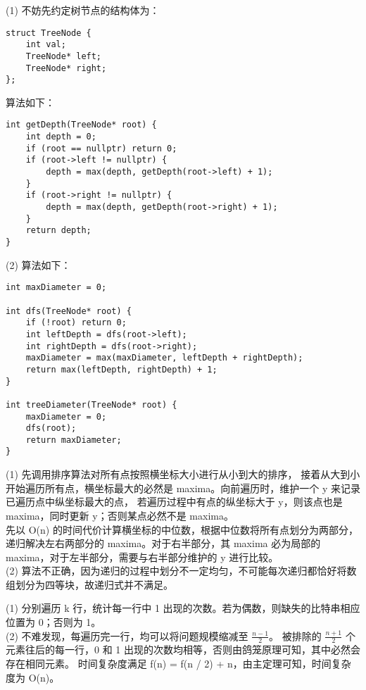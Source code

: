 \documentclass[12pt, a4paper, oneside]{ctexart}
\begin{document}
\begin{solution}[7.5]
(1) 不妨先约定树节点的结构体为：
\begin{verbatim}
struct TreeNode {
    int val;
    TreeNode* left;
    TreeNode* right;
};
\end{verbatim}
算法如下：
\begin{verbatim}
int getDepth(TreeNode* root) {
    int depth = 0;
    if (root == nullptr) return 0;
    if (root->left != nullptr) {
        depth = max(depth, getDepth(root->left) + 1);
    }
    if (root->right != nullptr) {
        depth = max(depth, getDepth(root->right) + 1);
    }
    return depth;
}
\end{verbatim}
(2) 算法如下：
\begin{verbatim}
int maxDiameter = 0;

int dfs(TreeNode* root) {
    if (!root) return 0;
    int leftDepth = dfs(root->left);
    int rightDepth = dfs(root->right);
    maxDiameter = max(maxDiameter, leftDepth + rightDepth);
    return max(leftDepth, rightDepth) + 1;
}

int treeDiameter(TreeNode* root) {
    maxDiameter = 0;
    dfs(root);
    return maxDiameter;
}
\end{verbatim}
\end{solution}

\begin{solution}[7.8]
(1) 先调用排序算法对所有点按照横坐标大小进行从小到大的排序，
接着从大到小开始遍历所有点，横坐标最大的必然是 maxima。向前遍历时，维护一个 y 来记录已遍历点中纵坐标最大的点，
若遍历过程中有点的纵坐标大于 y，则该点也是 maxima，同时更新 y；否则某点必然不是 maxima。
\\ 先以 O(n) 的时间代价计算横坐标的中位数，根据中位数将所有点划分为两部分，
递归解决左右两部分的 maxima。对于右半部分，其 maxima 必为局部的 maxima，对于左半部分，需要与右半部分维护的 y 进行比较。
\\(2) 算法不正确，因为递归的过程中划分不一定均匀，不可能每次递归都恰好将数组划分为四等块，故递归式并不满足。
\end{solution}

\begin{solution}[7.12]
(1) 分别遍历 k 行，统计每一行中 1 出现的次数。若为偶数，则缺失的比特串相应位置为 0；否则为 1。
\\(2) 不难发现，每遍历完一行，均可以将问题规模缩减至 $\frac{n - 1}{2}$。
被排除的 $\frac{n + 1}{2}$ 个元素往后的每一行，0 和 1 出现的次数均相等，否则由鸽笼原理可知，其中必然会存在相同元素。
时间复杂度满足 f(n) = f(n / 2) + n，由主定理可知，时间复杂度为 O(n)。
\end{solution}
\end{document}
